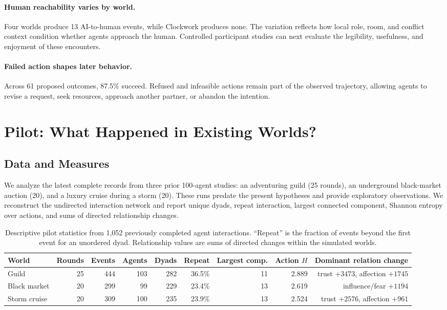 \documentclass[10pt,twocolumn]{article}
\begin{document}
\paragraph{Human reachability varies by world.}
Four worlds produce 13 AI-to-human events, while Clockwork produces none. The
variation reflects how local role, room, and conflict context condition whether
agents approach the human. Controlled participant studies can next evaluate the
legibility, usefulness, and enjoyment of these encounters.

\paragraph{Failed action shapes later behavior.}
Across 61 proposed outcomes, 87.5\% succeed. Refused and infeasible actions
remain part of the observed trajectory, allowing agents to revise a request,
seek resources, approach another partner, or abandon the intention.

\section{Pilot: What Happened in Existing Worlds?}

\subsection{Data and Measures}

We analyze the latest complete records from three prior 100-agent studies: an
adventuring guild (25 rounds), an underground black-market auction (20), and a
luxury cruise during a storm (20). These runs predate the present hypotheses
and provide exploratory observations. We reconstruct the undirected interaction
network and report unique dyads, repeat interaction, largest connected
component, Shannon entropy over actions, and sums of directed relationship
changes.

\begin{table}[t]
\centering
\small
\begin{tabular}{lrrrrrrrr}
\toprule
World & Rounds & Events & Agents & Dyads & Repeat & Largest comp. & Action $H$ & Dominant relation change \\
\midrule
Guild & 25 & 444 & 103 & 282 & 36.5\% & 11 & 2.889 & trust $+3473$, affection $+1745$ \\
Black market & 20 & 299 & 99 & 229 & 23.4\% & 13 & 2.619 & influence/fear $+1194$ \\
Storm cruise & 20 & 309 & 100 & 235 & 23.9\% & 13 & 2.524 & trust $+2576$, affection $+961$ \\
\bottomrule
\end{tabular}
\caption{Descriptive pilot statistics from 1,052 previously completed agent
interactions. ``Repeat'' is the fraction of events beyond the first event for
an unordered dyad. Relationship values are sums of directed changes within the
simulated worlds.}
\label{tab:pilot}
\end{table}
\end{document}
